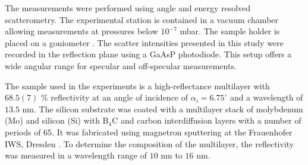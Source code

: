 \documentclass[twocolumn,osajnl,showpacs,superscriptaddress,11pt]{revtex4-1}
\begin{document}
The measurements were performed using angle and energy resolved scatterometry. The experimental station is contained in a vacuum chamber allowing measurements at pressures below $10^{-7}$ mbar. The sample holder is placed on a goniometer \cite{PTBBigRef}. The scatter intensities presented in this study were recorded in the reflection plane using a GaAsP photodiode. This setup offers a wide angular range for specular and off-specular measurements. 

The sample used in the experiments is a high-reflectance multilayer with $68.5(7)$ \% reflectivity at an angle of incidence of $\alpha_i = 6.75^\circ$ and a wavelength of $13.5$ nm. The silicon substrate was coated with a multilayer stack of molybdenum (Mo) and silicon (Si) with B$_4$C and carbon interdiffusion layers with a number of periods of 65. It was fabricated using magnetron sputtering at the Frauenhofer IWS, Dresden \cite{braun2002mo}. To determine the composition of the multilayer, the reflectivity was measured in a wavelength range of $10$ nm to $16$ nm. 
\end{document}
